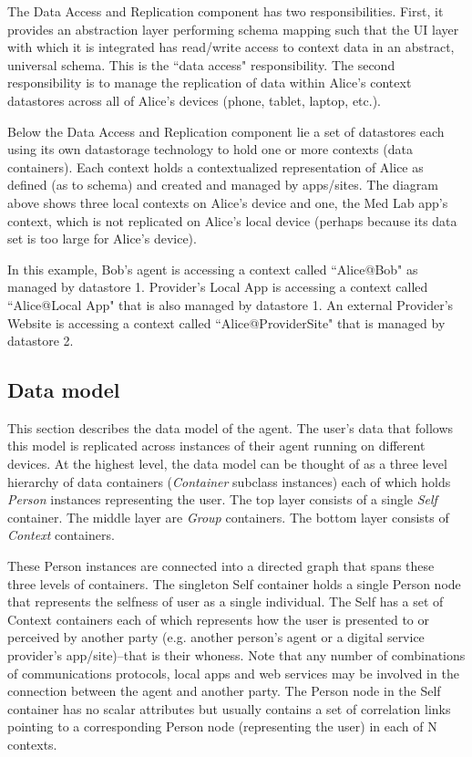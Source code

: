 \documentclass[11pt, oneside]{article}   	%
\begin{document}
The Data Access and Replication component has two responsibilities. First, it provides an abstraction layer performing schema mapping such that the UI layer with which it is integrated has read/write access to context data in an abstract, universal schema. This is the ``data access" responsibility. The second responsibility is to manage the replication of data within Alice's context datastores across all of Alice's devices (phone, tablet, laptop, etc.). 

Below the Data Access and Replication component lie a set of datastores each using its own datastorage technology to hold one or more contexts (data containers). Each context holds a contextualized representation of Alice as defined (as to schema) and created and managed by apps/sites. The diagram above shows three local contexts on Alice's device and one, the Med Lab app's context, which is not replicated on Alice's local device (perhaps because its data set is too large for Alice's device).

In this example, Bob's agent is accessing a context called ``Alice@Bob" as managed by datastore 1. Provider's Local App is accessing a context called ``Alice@Local App" that is also managed by datastore 1.  An external Provider's Website is accessing a context called ``Alice@ProviderSite" that is managed by datastore 2. 

\subsection{Data model} %

This section describes the data model of the agent. The user's data that follows this model is replicated across instances of their agent running on different devices. At the highest level, the data model can be thought of as a three level hierarchy of data containers (\emph{Container} subclass instances) each of which holds \emph{Person} instances representing the user. The top layer consists of a single \emph{Self} container. The middle layer are \emph{Group} containers. The bottom layer consists of \emph{Context} containers.

These Person instances are connected into a directed graph that spans these three levels of containers. The singleton Self container holds a single Person node that represents the selfness of user as a single individual. The Self has a set of Context containers each of which represents how the user is presented to or perceived by another party (e.g. another person's agent or a digital service provider's app/site)--that is their whoness. Note that any number of combinations of communications protocols, local apps and web services may be involved in the connection between the agent and another party. The Person node in the Self container has no scalar attributes but usually contains a set of correlation links pointing to a corresponding Person node (representing the user) in each of N contexts.
\end{document}
